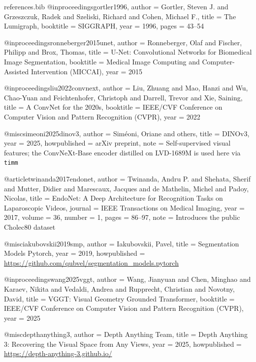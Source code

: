 \begin{filecontents*}[overwrite]{references.bib}
@inproceedings{gortler1996,
  author    = {Gortler, Steven J. and Grzeszczuk, Radek and Szeliski, Richard and Cohen, Michael F.},
  title     = {The Lumigraph},
  booktitle = {SIGGRAPH},
  year      = {1996},
  pages     = {43--54}
}

@inproceedings{ronneberger2015unet,
  author    = {Ronneberger, Olaf and Fischer, Philipp and Brox, Thomas},
  title     = {{U-Net}: Convolutional Networks for Biomedical Image Segmentation},
  booktitle = {Medical Image Computing and Computer-Assisted Intervention (MICCAI)},
  year      = {2015}
}

@inproceedings{liu2022convnext,
  author    = {Liu, Zhuang and Mao, Hanzi and Wu, Chao-Yuan and Feichtenhofer, Christoph and Darrell, Trevor and Xie, Saining},
  title     = {A {ConvNet} for the 2020s},
  booktitle = {IEEE/CVF Conference on Computer Vision and Pattern Recognition (CVPR)},
  year      = {2022}
}

@misc{simeoni2025dinov3,
  author       = {Sim{\'e}oni, Oriane and others},
  title        = {{DINOv3}},
  year         = {2025},
  howpublished = {arXiv preprint},
  note         = {Self-supervised visual features; the ConvNeXt-Base encoder distilled on LVD-1689M is used here via \texttt{timm}}
}

@article{twinanda2017endonet,
  author  = {Twinanda, Andru P. and Shehata, Sherif and Mutter, Didier and Marescaux, Jacques and de Mathelin, Michel and Padoy, Nicolas},
  title   = {{EndoNet}: A Deep Architecture for Recognition Tasks on Laparoscopic Videos},
  journal = {IEEE Transactions on Medical Imaging},
  year    = {2017},
  volume  = {36},
  number  = {1},
  pages   = {86--97},
  note    = {Introduces the public Cholec80 dataset}
}

@misc{iakubovskii2019smp,
  author       = {Iakubovskii, Pavel},
  title        = {Segmentation Models Pytorch},
  year         = {2019},
  howpublished = {\url{https://github.com/qubvel/segmentation_models.pytorch}}
}

@inproceedings{wang2025vggt,
  author    = {Wang, Jianyuan and Chen, Minghao and Karaev, Nikita and Vedaldi, Andrea and Rupprecht, Christian and Novotny, David},
  title     = {{VGGT}: Visual Geometry Grounded Transformer},
  booktitle = {IEEE/CVF Conference on Computer Vision and Pattern Recognition (CVPR)},
  year      = {2025}
}

@misc{depthanything3,
  author       = {{Depth Anything Team}},
  title        = {Depth Anything 3: Recovering the Visual Space from Any Views},
  year         = {2025},
  howpublished = {\url{https://depth-anything-3.github.io/}}
}

\end{filecontents*}


